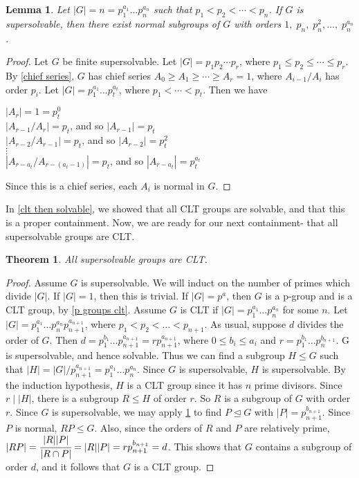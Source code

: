 \documentclass[12pt]{report}
\theoremstyle{newthm}
\newtheorem{Theorem}[lem]{Theorem}
\newtheorem{Lemma}[lem]{Lemma}
\begin{document}
\begin{Lemma}\label{p group each div}\cite[Lemma 2]{Bray}
Let $|G|=n=p_1^{a_1}\dotsc p_n^{a_n}$ such that $p_1<p_2<\dotsi <p_n$. If $G$ is supersolvable, then there exist normal subgroups of $G$ with orders $1,\;p_n,\;p_n^2,\dotsc,\;p_n^{a_n}$. 
\end{Lemma}

\begin{proof}
Let $G$ be finite supersolvable. Let $|G|=p_1p_2\dotsi p_r$, where $p_1\leq p_2\leq\dotsi\leq p_r$. By \cref{chief series}, $G$ has chief series $A_0\geq A_1\geq\dotsi\geq A_r=1$, where $A_{i-1}/A_i$ has order $p_i$. Let $|G| = p_1^{a_1}\dots p_t^{a_t}$, where $p_1 <\dotsi < p_t$. Then we have
\begin{center}
    $|A_r| = 1 = p_t^0$\\
    $|A_{r-1}/A_r|=p_t$, and so $|A_{r-1}|=p_t$ \\
    $|A_{r-2}/A_{r-1}|=p_t$, and so $|A_{r-2}| = p_t^2$\\
    $\vdots$\\
    $|A_{r-a_t}/A_{r-(a_t-1)}| = p_t$, and so $|A_{r-a_t}|=p_t^{a_t}$
\end{center}
Since this is a chief series, each $A_i$ is normal in $G$.
\end{proof}



In \cref{clt then solvable}, we showed that all CLT groups are solvable, and that this is a proper containment. Now, we are ready for our next containment- that all supersolvable groups are CLT.

\begin{Theorem}\label{supersolvable then clt}\cite[Theorem 2]{Bray} All supersolvable groups are CLT.
\end{Theorem}

\begin{proof}
Assume $G$ is supersolvable. We will induct on the number of primes which divide $|G|$. If $|G|=1$, then this is trivial. If $|G|=p^a$, then $G$ is a p-group and is a CLT group, by \cref{p groups clt}. Assume $G$ is  CLT if $|G|=p_1^{a_1}\dotsc p_n^{a_n}$ for some $n$. Let $|G|=p_1^{a_1}\dotsc p_n^{a_n}p_{n+1}^{a_{n+1}}$, where $p_1<p_2<\dotsc <p_{n+1}$. As usual, suppose $d$ divides the order of $G$. Then $d=p_1^{b_1}\dotsc p_{n+1}^{a_{n+1}}=rp_{n+1}^{a_{n+1}}$, where $0\leq b_i\leq a_i$ and $r=p_1^{b_1}\dotsc p_n^{b_{n+1}}$. G is supersolvable, and hence solvable. Thus we can find a subgroup $H\leq G$ such that $|H|={|G|}/{p_{n+1}^{a_{n+1}}}=p_1^{a_1}\dotsc p_n^{a_n}$. Since $G$ is supersolvable, $H$ is supersolvable. By the induction hypothesis, $H$ is a CLT group since it has $n$ prime divisors. Since $r\mid |H|$, there is a subgroup $R\leq H$ of order $r$. So $R$ is a subgroup of $G$ with order $r$. Since $G$ is supersolvable, we may apply \cref{p group each div} to find $P\trianglelefteq G$ with $|P|=p_{n+1}^{b_{n+1}}$. Since $P$ is normal, $RP\leq G$. Also, since the orders of $R$ and $P$ are relatively prime, $|RP|=\cfrac{|R||P|}{|R\cap P|}=|R||P|=rp_{n+1}^{b_{n+1}}=d$. This shows that $G$ contains a subgroup of order $d$, and it follows that $G$ is a CLT group. 
\end{proof}
\end{document}
